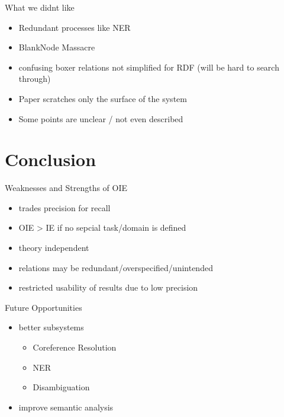 \documentclass[11pt]{beamer}
\begin{document}
		\begin{frame}{What we didnt like}
			\begin{itemize}
				\item<1-5> Redundant processes like NER
				\item<2-5> BlankNode Massacre
				\item<3-5> confusing boxer relations not simplified for RDF (will be hard to search through)
				
				\vspace{15pt}
				
				\item<4-5> Paper scratches only the surface of the system
				\item<5> Some points are unclear / not even described
			\end{itemize}
		\end{frame}
\section{Conclusion}
	\begin{frame}{Weaknesses and Strengths of OIE}
		\begin{itemize}
			\item trades precision for recall
			\item OIE > IE if no sepcial task/domain is defined
			\item theory independent
			\item relations may be redundant/overspecified/unintended
			\item restricted usability of results due to low precision
		\end{itemize}
	\end{frame}
	\begin{frame}{Future Opportunities}
		\begin{itemize}
			\item better subsystems\\
				\begin{itemize}
					\item Coreference Resolution
					\item NER
					\item Disambiguation
				\end{itemize}
			\item improve semantic analysis
		\end{itemize}
	\end{frame}
	
\end{document}
